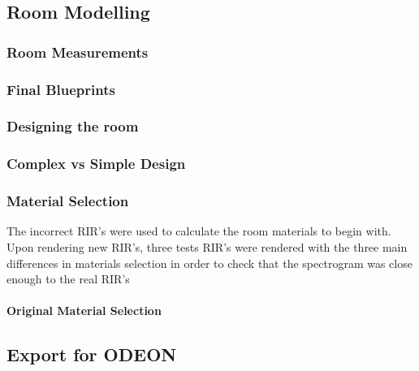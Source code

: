 \documentclass[../../main.tex]{subfiles}
\begin{document}
	\subsection{Room Modelling}

		\subsubsection{Room Measurements}

		\subsubsection{Final Blueprints}

		\subsubsection{Designing the room}

		\subsubsection{Complex vs Simple Design}

		\subsubsection{Material Selection}

			The incorrect \ac{RIR}'s were used to calculate the room materials to begin with. Upon rendering new \ac{RIR}'s, three tests \ac{RIR}'s were rendered with the three main differences in materials selection in order to check that the spectrogram was close enough to the real \ac{RIR}'s
			\paragraph{Original Material Selection}

	\subsection{Export for ODEON}
\end{document}
